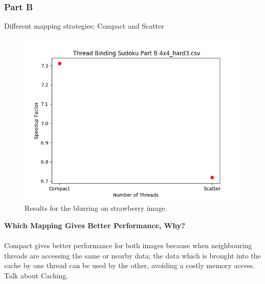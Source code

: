 \documentclass{article}
\newcommand\tab[1][0.5cm]{\hspace*{#1}}
\begin{document}
\subsubsection{Part B}
\begin{description}
    \item[Different mapping strategies; Compact and Scatter]
\end{description}
\begin{figure}[!htb]
    \centering
    \includegraphics[width=1\linewidth]{./img/binding_part_2_B.png}
    \caption{Results for the blurring on strawberry image.}
\end{figure}
\textbf{Which Mapping Gives Better Performance, Why?}\\
\\ \tab Compact gives better performance for both images because 
when neighbouring threads are accessing the same or nearby data;
the data which is brought into the cache by one thread can be used 
by the other, avoiding a costly memory access.
\\ Talk about Caching.

\newpage
\end{document}
